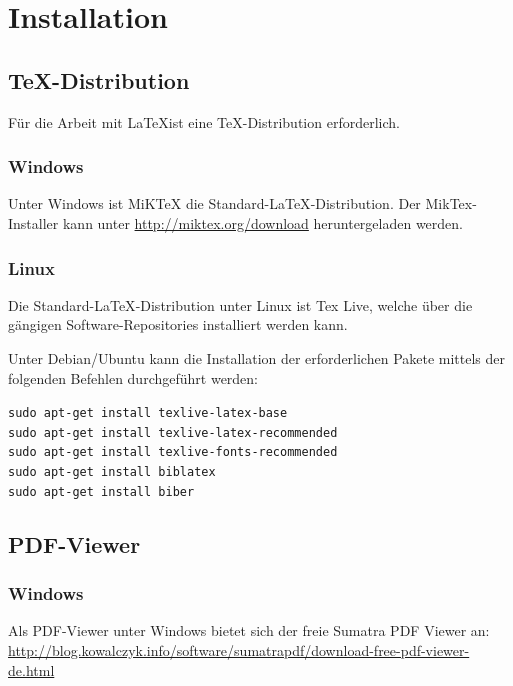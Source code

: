 \section{Installation}
\label{instal}

\subsection{TeX-Distribution}

Für die Arbeit mit \LaTeX ist eine TeX-Distribution erforderlich. 

\subsubsection{Windows}

Unter Windows ist MiKTeX die Standard-{\LaTeX}-Distribution. Der MikTex-Installer kann unter \url{http://miktex.org/download} heruntergeladen werden.

\subsubsection{Linux}

Die Standard-{\LaTeX}-Distribution unter Linux ist Tex Live, welche über die gängigen Software-Repositories installiert werden kann.

Unter Debian/Ubuntu kann die Installation der erforderlichen Pakete mittels der folgenden Befehlen durchgeführt werden:

\begin{quoting}
\texttt{sudo apt-get install texlive-latex-base}\\
\texttt{sudo apt-get install texlive-latex-recommended}\\
\texttt{sudo apt-get install texlive-fonts-recommended}\\
\texttt{sudo apt-get install biblatex}\\
\texttt{sudo apt-get install biber}
\end{quoting}

\subsection{PDF-Viewer}

\subsubsection{Windows}

Als PDF-Viewer unter Windows bietet sich der freie Sumatra PDF Viewer an: \url{http://blog.kowalczyk.info/software/sumatrapdf/download-free-pdf-viewer-de.html}

